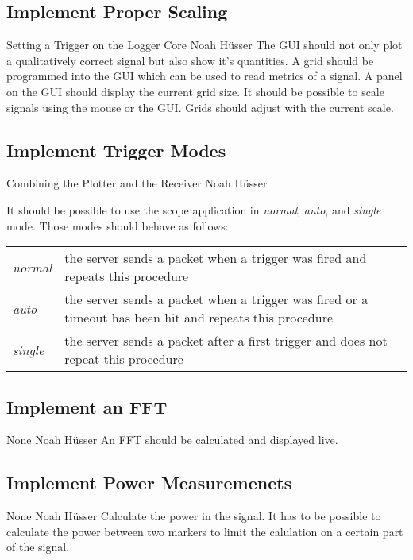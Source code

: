 \documentclass[a4paper,oneside]{alpenspecs/alpenspecs}
\begin{document}
\subsection{Implement Proper Scaling}
\label{subsec:frontend:}
\wpac
     {}
     {}
     {}
     {Setting a Trigger on the Logger Core}
     {}
     {Noah Hüsser}
     {%
         The GUI should not only plot a qualitatively correct signal but also show it's quantities.
         A grid should be programmed into the GUI which can be used to read metrics of a signal. A panel on the GUI should display the current grid size.
         It should be possible to scale signals using the mouse or the GUI. Grids should adjust with the current scale.
     }

\subsection{Implement Trigger Modes}
\label{subsec:frontend:}
\wpac
     {}
     {}
     {}
     {Combining the Plotter and the Receiver}
     {}
     {Noah Hüsser}
     {%
         It should be possible to use the scope application in \textit{normal}, \textit{auto}, and \textit{single} mode. Those modes should behave as follows:
         \begin{tabular}{l l}
            \textit{normal} & the server sends a packet when a trigger was fired and repeats this procedure \\
            \textit{auto} & the server sends a packet when a trigger was fired or a timeout has been hit and repeats this procedure \\
            \textit{single} & the server sends a packet after a first trigger and does not repeat this procedure
         \end{tabular}
     }

\subsection{Implement an FFT}
\label{subsec:frontend:}
\wpac
     {}
     {}
     {}
     {None}
     {}
     {Noah Hüsser}
     {%
         An FFT should be calculated and displayed live.
     }

\subsection{Implement Power Measuremenets}
\label{subsec:frontend:}
\wpac
     {}
     {}
     {}
     {None}
     {}
     {Noah Hüsser}
     {%
         Calculate the power in the signal.
         It has to be possible to calculate the power between two markers to limit the calulation on a certain part of the signal.
     }
\end{document}
